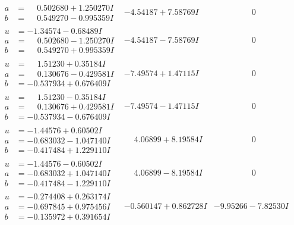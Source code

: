 \documentclass[1p]{elsarticle_modified}
\theoremstyle{definition}
\begin{document}
$$\begin{array}{c|c|c}
\begin{aligned}
a &= \phantom{-}0.502680 + 1.250270 I \\
b &= \phantom{-}0.549270 - 0.995359 I\end{aligned}
 & -4.54187 + 7.58769 I & \phantom{-0.000000 } 0 \\ \hline\begin{aligned}
u &= -1.34574 - 0.68489 I \\
a &= \phantom{-}0.502680 - 1.250270 I \\
b &= \phantom{-}0.549270 + 0.995359 I\end{aligned}
 & -4.54187 - 7.58769 I & \phantom{-0.000000 } 0 \\ \hline\begin{aligned}
u &= \phantom{-}1.51230 + 0.35184 I \\
a &= \phantom{-}0.130676 - 0.429581 I \\
b &= -0.537934 + 0.676409 I\end{aligned}
 & -7.49574 + 1.47115 I & \phantom{-0.000000 } 0 \\ \hline\begin{aligned}
u &= \phantom{-}1.51230 - 0.35184 I \\
a &= \phantom{-}0.130676 + 0.429581 I \\
b &= -0.537934 - 0.676409 I\end{aligned}
 & -7.49574 - 1.47115 I & \phantom{-0.000000 } 0 \\ \hline\begin{aligned}
u &= -1.44576 + 0.60502 I \\
a &= -0.683032 - 1.047140 I \\
b &= -0.417484 + 1.229110 I\end{aligned}
 & \phantom{-}4.06899 + 8.19584 I & \phantom{-0.000000 } 0 \\ \hline\begin{aligned}
u &= -1.44576 - 0.60502 I \\
a &= -0.683032 + 1.047140 I \\
b &= -0.417484 - 1.229110 I\end{aligned}
 & \phantom{-}4.06899 - 8.19584 I & \phantom{-0.000000 } 0 \\ \hline\begin{aligned}
u &= -0.274408 + 0.263174 I \\
a &= -0.697845 + 0.975456 I \\
b &= -0.135972 + 0.391654 I\end{aligned}
 & -0.560147 + 0.862728 I & -9.95266 - 7.82530 I \\ \hline\begin{aligned}

\end{aligned}
\end{array}$$
\end{document}
